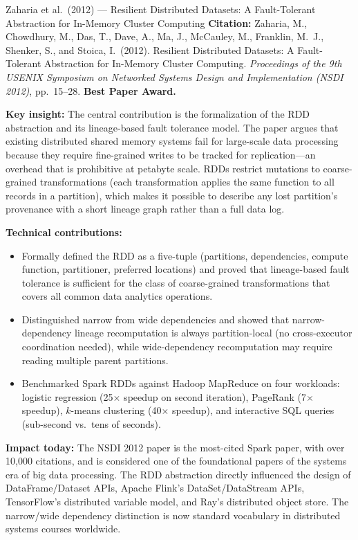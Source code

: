 \begin{researchspotlight}{Zaharia et al.\ (2012) --- Resilient Distributed Datasets: A Fault-Tolerant Abstraction for In-Memory Cluster Computing}
\textbf{Citation:} Zaharia, M., Chowdhury, M., Das, T., Dave, A., Ma, J.,
McCauley, M., Franklin, M.~J., Shenker, S., and Stoica, I.\ (2012).
Resilient Distributed Datasets: A Fault-Tolerant Abstraction for In-Memory
Cluster Computing. \textit{Proceedings of the 9th USENIX Symposium on
Networked Systems Design and Implementation (NSDI 2012)}, pp.\ 15--28.
\textbf{Best Paper Award.} \parencite{RDD2012}

\smallskip\noindent
\textbf{Key insight:} The central contribution is the formalization of
the RDD abstraction and its lineage-based fault tolerance model. The
paper argues that existing distributed shared memory systems fail for
large-scale data processing because they require fine-grained writes to
be tracked for replication---an overhead that is prohibitive at
petabyte scale. RDDs restrict mutations to coarse-grained
transformations (each transformation applies the same function to all
records in a partition), which makes it possible to describe any lost
partition's provenance with a short lineage graph rather than a full
data log.

\smallskip\noindent
\textbf{Technical contributions:}
\begin{itemize}
  \item Formally defined the RDD as a five-tuple (partitions, dependencies,
        compute function, partitioner, preferred locations) and proved
        that lineage-based fault tolerance is sufficient for the class
        of coarse-grained transformations that covers all common data
        analytics operations.
  \item Distinguished narrow from wide dependencies and showed that
        narrow-dependency lineage recomputation is always partition-local
        (no cross-executor coordination needed), while wide-dependency
        recomputation may require reading multiple parent partitions.
  \item Benchmarked Spark RDDs against Hadoop MapReduce on four workloads:
        logistic regression (25$\times$ speedup on second iteration),
        PageRank (7$\times$ speedup), $k$-means clustering (40$\times$
        speedup), and interactive SQL queries (sub-second vs.\ tens of
        seconds).
\end{itemize}

\smallskip\noindent
\textbf{Impact today:} The NSDI 2012 paper is the most-cited Spark
paper, with over 10{,}000 citations, and is considered one of the
foundational papers of the systems era of big data processing. The RDD
abstraction directly influenced the design of DataFrame/Dataset APIs,
Apache Flink's DataSet/DataStream APIs, TensorFlow's distributed variable
model, and Ray's distributed object store. The narrow/wide dependency
distinction is now standard vocabulary in distributed systems courses
worldwide.
\end{researchspotlight}

